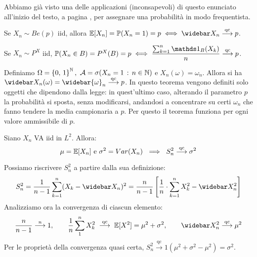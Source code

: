 Abbiamo già visto una delle applicazioni (inconsapevoli) di questo enunciato all'inizio del testo, a pagina \pageref{come-assegnare-prob}, per assegnare una probabilità in modo frequentista.

\medskip
\begin{ese}
  Se $X_n \sim Be(p)$ iid, allora $\EE[X_n]=\PP(X_n=1)=p \iff \widebar X_n \stackrel{\text{qc}}{\longrightarrow} p$.
\end{ese}

\begin{ese}
  Se $X_n \sim P^X$ iid, $\PP(X_n \in B)=P^X(B)=p \iff \dfrac{\sum_{k=1}^n \Ind_B(X_k)}{n} \stackrel{\text{qc}}{\longrightarrow} p$.
\end{ese}

\begin{ese}
  Definiamo $\Omega = \left \{ 0, \, 1 \right \}^\mathbb N, \ \mathcal A=\sigma(X_n=1 \, : \, n \in \mathbb N) $ e $ X_n(\omega)=\omega_n$. Allora si ha $\widebar X_n(\omega)=\widebar{\omega}_n \stackrel{\text{qc}}{\longrightarrow} p$.
  In questo teorema vengono definiti solo oggetti che dipendono dalla legge: in quest'ultimo caso, alterando il parametro $p$ la probabilità si sposta, senza modificarsi, andandosi a concentrare su certi $\omega_n$ che fanno tendere la media campionaria a $p$.
  Per questo il teorema funziona per ogni valore ammissibile di $p$.
\end{ese}
\medskip

\begin{prop}
  Siano $X_n$ VA iid in $L^2$. Allora:
  $$\mu= \mathbb E[X_n] \text{ e } \sigma^2=Var(X_n) \ \implies \ S^2_n \stackrel{\text{qc}}{\longrightarrow} \sigma^2$$
\end{prop}

\begin{dimo}
  Possiamo riscrivere $S^2_n$ a partire dalla sua definizione:
  $$S^2_n = \dfrac{1}{n-1} \sum_{k=1}^{n}(X_k-\widebar X_n)^2 =
  \dfrac{n}{n-1} \left[\frac{1}{n} \cdot \sum_{k=1}^{n} X_k^2 - \widebar X_n^2\right]$$
  Analizziamo ora la convergenza di ciascun elemento:
  $$ \dfrac{n}{n-1} \stackrel{n}{\longrightarrow} 1, \qquad
  \frac{1}{n}\sum_{1}^{n}X_k^2 \; \stackrel{\text{qc}}{\longrightarrow} \; \EE[X^2] = \mu^2 + \sigma^2, \qquad
  \widebar X_n^2 \stackrel{\text{qc}}{\longrightarrow} \mu^2$$
  Per le proprietà della convergenza quasi certa, $S^2_n \stackrel{\text{qc}}{\longrightarrow} 1(\mu^2 + \sigma^2 - \mu^2)=\sigma^2$.
\end{dimo}

